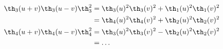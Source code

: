 \begin{equation}\label{riemann-addition}
  \begin{split}
    \th_3(u+v) \th_3(u-v) \th_3^2 &= \th_3(u)^2 \th_3(v)^2 +
    \th_1(u)^2 \th_1(v)^2  \\
    &= \th_4(u)^2 \th_4(v)^2 +\th_2(u)^2 \th_2(v)^2 \\
    \th_4(u+v) \th_4(u-v) \th_4^2 &= \th_3(u)^2 \th_3(v)^2 -
    \th_2(u)^2 \th_2(v)^2  \\
    &=\dots
  \end{split}
\end{equation}

